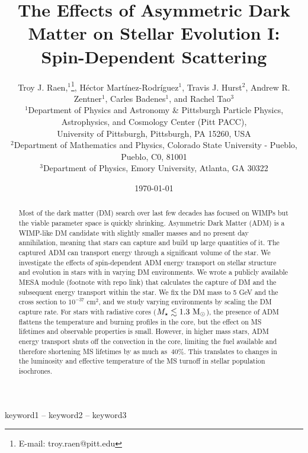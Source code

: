 \documentclass[useAMS,usenatbib]{mnras}
\title[Asymmetric Dark Matter in Stars]{The Effects of Asymmetric Dark Matter on Stellar Evolution I: Spin\hyp{}Dependent Scattering}
\author[T.J. Raen et al.]{%
Troy J. Raen,$^{1}$\thanks{E\hyp{}mail: troy.raen@pitt.edu},
Héctor Martínez\hyp{}Rodríguez$^{1}$,
Travis J. Hurst$^{2}$,
Andrew R. Zentner$^{1}$,\newauthor
Carles Badenes$^{1}$,
and Rachel Tao$^{3}$
\vspace*{12pt}
\\
$^{1}$Department of Physics and Astronomy \& Pittsburgh Particle Physics, Astrophysics, and Cosmology Center (Pitt PACC),\\ University of Pittsburgh, Pittsburgh, PA 15260, USA\\
$^{2}$Department of Mathematics and Physics, Colorado State University \hyp{} Pueblo, Pueblo, C0, 81001 \\%
$^{3}$Department of Physics, Emory University, Atlanta, GA 30322
}
\date{\today}
\begin{document}
\label{firstpage}
\pagerange{\pageref{firstpage}--\pageref{lastpage}}
\maketitle



\begin{abstract}
Most of the dark matter (DM) search over last few decades has focused on WIMPs but the viable parameter space is quickly shrinking. Asymmetric Dark Matter (ADM) is a WIMP-like DM candidate with slightly smaller masses and no present day annihilation, meaning that stars can capture and build up large quantities of it. The captured ADM can transport energy through a significant volume of the star. We investigate the effects of spin-dependent ADM energy transport on stellar structure and evolution in stars with \mrange in varying DM environments. We wrote a publicly available MESA module (footnote with repo link) that calculates the capture of DM and the subsequent energy transport within the star. We fix the DM mass to 5 GeV and the cross section to $10^{-37}$ cm${^2}$, and we study varying environments by scaling the DM capture rate. For stars with radiative cores ($M_{\star} \lesssim 1.3 \ \mathrm{M}_{\odot}$), the presence of ADM flattens the temperature and burning profiles in the core, but the effect on MS lifetimes and observable properties is small. However, in higher mass stars, ADM energy transport shuts off the convection in the core, limiting the fuel available and therefore shortening MS lifetimes by as much as $~40\%$. This translates to changes in the luminosity and effective temperature of the MS turnoff in stellar population isochrones.
\end{abstract}

\begin{keywords}
keyword1 -- keyword2 -- keyword3
\end{keywords}























\bsp	%

\label{lastpage}
\end{document}
